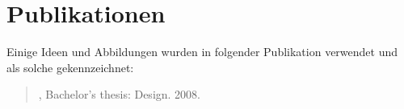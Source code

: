 \chapter*{Publikationen}
Einige Ideen und Abbildungen wurden in folgender Publikation verwendet und als solche gekennzeichnet:

\bigskip

\noindent \begin{quote}, Bachelor’s thesis: Design. 2008.\end{quote}